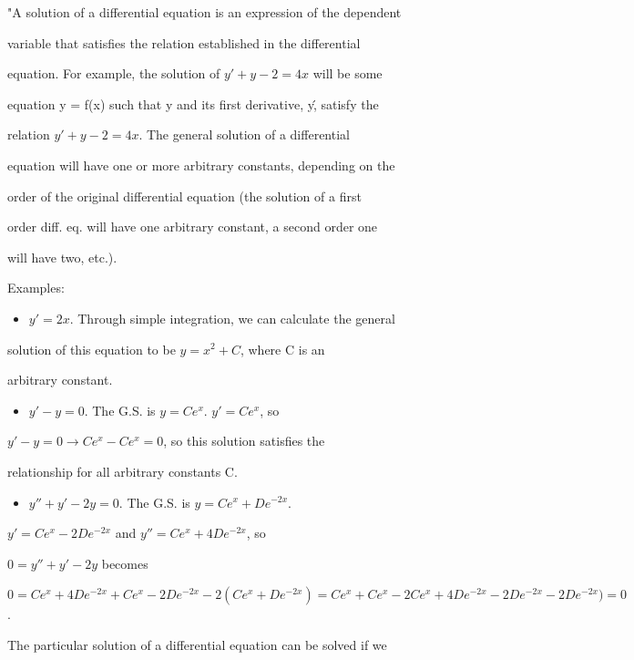 "A solution of a differential equation is an expression of the dependent

variable that satisfies the relation established in the differential

equation. For example, the solution of $y' + y - 2 = 4x$ will be some

equation y = f(x) such that y and its first derivative, y\', satisfy the

relation $y' + y - 2 = 4x$. The general solution of a differential

equation will have one or more arbitrary constants, depending on the

order of the original differential equation (the solution of a first

order diff. eq. will have one arbitrary constant, a second order one

will have two, etc.).



Examples:



\begin{itemize}
    \item $y' = 2x$. Through simple integration, we can calculate the general
\end{itemize}
    solution of this equation to be $y = x^2 + C$, where C is an

    arbitrary constant.

\begin{itemize}
    \item $y' - y = 0$. The G.S. is $y = Ce^{x}$. $y' = Ce^{x}$, so
\end{itemize}
    $y' - y = 0 \to Ce^{x} - Ce^{x} = 0$, so this solution satisfies the

    relationship for all arbitrary constants C.

\begin{itemize}
    \item $y'' + y' - 2y = 0$. The G.S. is $y = Ce^{x} + De^{-2x}$.
\end{itemize}
    $y' = Ce^{x} - 2De^{-2x}$ and $y'' = Ce^{x} + 4De^{-2x}$, so

    $0 = y'' + y' - 2y$ becomes

    $0 = Ce^{x} + 4De^{-2x} + Ce^{x} - 2De^{-2x} - 2(Ce^{x} + De^{-2x}) = Ce^{x} + Ce^{x} - 2Ce^{x} + 4De^{-2x} - 2De^{-2x} - 2De^{-2x}) = 0$.



The particular solution of a differential equation can be solved if we

